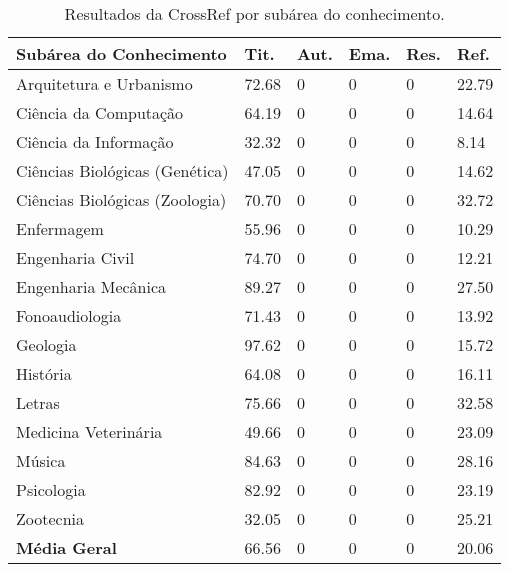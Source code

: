 \begin{table}
    \caption{Resultados da CrossRef por subárea do conhecimento.}
    \begin{center}
        \begin{tabular}{|p{6cm}|C{1.2cm}|C{1.2cm}|C{1.2cm}|C{1.2cm}|C{1.2cm}|}
            \hline 
            \textbf{Subárea do Conhecimento} & \textbf{Tit.} & \textbf{Aut.} & \textbf{Ema.} & \textbf{Res.} & \textbf{Ref.} \\ \hline 
            Arquitetura e Urbanismo & 72.68 & 0 & 0 & 0 & 22.79 \\ \hline
            Ciência da Computação & 64.19 & 0 & 0 & 0 & 14.64 \\ \hline
            Ciência da Informação & 32.32 & 0 & 0 & 0 & 8.14 \\ \hline
            Ciências Biológicas (Genética) & 47.05 & 0 & 0 & 0 & 14.62 \\ \hline
            Ciências Biológicas (Zoologia) & 70.70 & 0 & 0 & 0 & 32.72 \\ \hline
            Enfermagem & 55.96 & 0 & 0 & 0 & 10.29 \\ \hline
            Engenharia Civil & 74.70 & 0 & 0 & 0 & 12.21 \\ \hline
            Engenharia Mecânica & 89.27 & 0 & 0 & 0 & 27.50 \\ \hline
            Fonoaudiologia & 71.43 & 0 & 0 & 0 & 13.92 \\ \hline
            Geologia & 97.62 & 0 & 0 & 0 & 15.72 \\ \hline
            História & 64.08 & 0 & 0 & 0 & 16.11 \\ \hline
            Letras & 75.66 & 0 & 0 & 0 & 32.58 \\ \hline
            Medicina Veterinária & 49.66 & 0 & 0 & 0 & 23.09 \\ \hline
            Música & 84.63 & 0 & 0 & 0 & 28.16 \\ \hline
            Psicologia & 82.92 & 0 & 0 & 0 & 23.19 \\ \hline
            Zootecnia & 32.05 & 0 & 0 & 0 & 25.21 \\ \hline
            \textbf{Média Geral} & 66.56 & 0 & 0 & 0 & 20.06 \\ \hline
        \end{tabular}
    \end{center}
    \label{tab:results-crossref}
\end{table}

